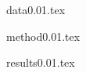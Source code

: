 \documentclass[useAMS,usenatbib]{mn2e}
\begin{document}
{data0.01.tex}


{method0.01.tex}

{results0.01.tex}


\end{document}
